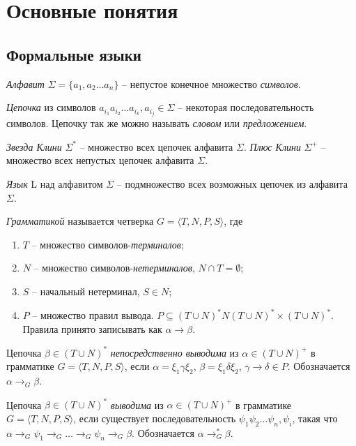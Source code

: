 \chapter{Основные понятия} \label{chapter1}

\section{Формальные языки}

\emph{Алфавит} $\Sigma = \{ a_1, a_2 \dots a_n \}$ -- непустое конечное множество \emph{символов}.

\emph{Цепочка} из символов $a_{i_1} a_{i_2} \dots a_{i_k}, a_{i_j} \in \Sigma$ -- некоторая последовательность символов.
Цепочку так же можно называть \emph{словом} или \emph{предложением}.

\emph{Звезда Клини} $\Sigma^*$ -- множество всех цепочек алфавита $\Sigma$.
\emph{Плюс Клини} $\Sigma^+$ -- множество всех непустых цепочек алфавита $\Sigma$.

\emph{Язык} L над алфавитом $\Sigma$ -- подмножество всех возможных цепочек из алфавита $\Sigma$.

\emph{Грамматикой} называется четверка $G = \langle T, N, P, S \rangle$, где
\begin{enumerate}[label=\arabic*)]
    \item $T$ -- множество символов-\emph{терминалов};
    \item $N$ -- множество символов-\emph{нетерминалов}, $N \cap T = \emptyset$;
    \item $S$ -- начальный нетерминал, $S \in N$;
    \item {
        $P$ -- множество правил вывода. $P \subseteq (T \cup N)^*N(T \cup N)^* \times (T \cup N)^*$.
        Правила принято записывать как $\alpha \rightarrow \beta$.
    }
\end{enumerate}

Цепочка $\beta \in (T \cup N)^*$ \emph{непосредственно выводима} из $\alpha \in (T \cup N)^+$ в 
грамматике $G = \langle T, N, P, S \rangle$,
если $\alpha = \xi_1 \gamma \xi_2$, $\beta = \xi_1 \delta \xi_2$, $\gamma \rightarrow \delta \in P$.
Обозначается $\alpha \rightarrow_G \beta$.

Цепочка $\beta \in (T \cup N)^*$ \emph{выводима} из $\alpha \in (T \cup N)^+$ в 
грамматике $G = \langle T, N, P, S \rangle$, если существует последовательность
$\psi_1 \psi_2 \dots \psi_n, \psi_i$, такая что $\alpha \rightarrow_G \psi_1 \rightarrow_G \dots \rightarrow_G \psi_n \rightarrow_G \beta$. Обозначается $\alpha \rightarrow_G^* \beta$.

